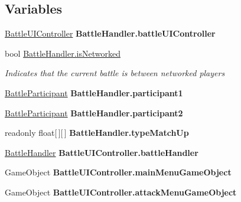 \subsection*{Variables}
\begin{DoxyCompactItemize}
\item 
\hypertarget{group__client_gad57da165c3aa4c3906b10dc80cca73e2}{\hyperlink{class_battle_u_i_controller}{Battle\-U\-I\-Controller} {\bfseries Battle\-Handler.\-battle\-U\-I\-Controller}}\label{group__client_gad57da165c3aa4c3906b10dc80cca73e2}

\item 
bool \hyperlink{group__client_ga91faa80b5273370273762c40a364305d}{Battle\-Handler.\-is\-Networked}
\begin{DoxyCompactList}\small\item\em Indicates that the current battle is between networked players \end{DoxyCompactList}\item 
\hypertarget{group__client_ga95fc9651e0a7845913c3a2bf1330e2cf}{\hyperlink{class_battle_participant}{Battle\-Participant} {\bfseries Battle\-Handler.\-participant1}}\label{group__client_ga95fc9651e0a7845913c3a2bf1330e2cf}

\item 
\hypertarget{group__client_ga303ed561d4ed9408dfb02b03034ed2a9}{\hyperlink{class_battle_participant}{Battle\-Participant} {\bfseries Battle\-Handler.\-participant2}}\label{group__client_ga303ed561d4ed9408dfb02b03034ed2a9}

\item 
readonly float\mbox{[}$\,$\mbox{]}\mbox{[}$\,$\mbox{]} {\bfseries Battle\-Handler.\-type\-Match\-Up}
\item 
\hypertarget{group__client_ga1b3ecd57ac7d9161ea56b8942003a2b5}{\hyperlink{class_battle_handler}{Battle\-Handler} {\bfseries Battle\-U\-I\-Controller.\-battle\-Handler}}\label{group__client_ga1b3ecd57ac7d9161ea56b8942003a2b5}

\item 
\hypertarget{group__client_gab272bc3fa2feae7a46ee866a5252d47b}{Game\-Object {\bfseries Battle\-U\-I\-Controller.\-main\-Menu\-Game\-Object}}\label{group__client_gab272bc3fa2feae7a46ee866a5252d47b}

\item 
\hypertarget{group__client_ga0c493074ee8edeaaeafd6be0792f1b8e}{Game\-Object {\bfseries Battle\-U\-I\-Controller.\-attack\-Menu\-Game\-Object}}\label{group__client_ga0c493074ee8edeaaeafd6be0792f1b8e}


\end{DoxyCompactItemize}
